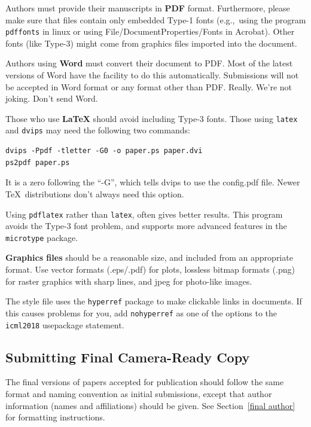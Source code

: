\documentclass{article}
\begin{document}
\medskip

Authors must provide their manuscripts in \textbf{PDF} format.
Furthermore, please make sure that files contain only embedded Type-1 fonts
(e.g.,~using the program \texttt{pdffonts} in linux or using
File/DocumentProperties/Fonts in Acrobat). Other fonts (like Type-3)
might come from graphics files imported into the document.

Authors using \textbf{Word} must convert their document to PDF\@. Most
of the latest versions of Word have the facility to do this
automatically. Submissions will not be accepted in Word format or any
format other than PDF\@. Really. We're not joking. Don't send Word.

Those who use \textbf{\LaTeX} should avoid including Type-3 fonts.
Those using \texttt{latex} and \texttt{dvips} may need the following
two commands:

{\footnotesize
\begin{verbatim}
dvips -Ppdf -tletter -G0 -o paper.ps paper.dvi
ps2pdf paper.ps
\end{verbatim}}
It is a zero following the ``-G'', which tells dvips to use
the config.pdf file. Newer \TeX\ distributions don't always need this
option.

Using \texttt{pdflatex} rather than \texttt{latex}, often gives better
results. This program avoids the Type-3 font problem, and supports more
advanced features in the \texttt{microtype} package.

\textbf{Graphics files} should be a reasonable size, and included from
an appropriate format. Use vector formats (.eps/.pdf) for plots,
lossless bitmap formats (.png) for raster graphics with sharp lines, and
jpeg for photo-like images.

The style file uses the \texttt{hyperref} package to make clickable
links in documents. If this causes problems for you, add
\texttt{nohyperref} as one of the options to the \texttt{icml2018}
usepackage statement.


\subsection{Submitting Final Camera-Ready Copy}

The final versions of papers accepted for publication should follow the
same format and naming convention as initial submissions, except that
author information (names and affiliations) should be given. See
Section~\ref{final author} for formatting instructions.
\end{document}
